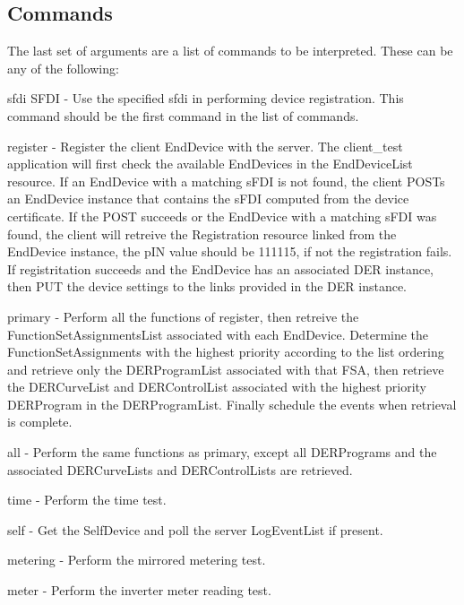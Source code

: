 \subsection*{Commands }

The last set of arguments are a list of commands to be interpreted. These can be any of the following\+:


\begin{DoxyItemize}
\item {\ttfamily sfdi S\+F\+DI} -\/ Use the specified sfdi in performing device registration. This command should be the first command in the list of commands.
\item {\ttfamily register} -\/ Register the client End\+Device with the server. The {\ttfamily client\+\_\+test} application will first check the available End\+Devices in the End\+Device\+List resource. If an End\+Device with a matching s\+F\+DI is not found, the client P\+O\+S\+Ts an End\+Device instance that contains the s\+F\+DI computed from the device certificate. If the P\+O\+ST succeeds or the End\+Device with a matching s\+F\+DI was found, the client will retreive the Registration resource linked from the End\+Device instance, the p\+IN value should be 111115, if not the registration fails. If registritation succeeds and the End\+Device has an associated D\+ER instance, then P\+UT the device settings to the links provided in the D\+ER instance.
\item {\ttfamily primary} -\/ Perform all the functions of {\ttfamily register}, then retreive the Function\+Set\+Assignments\+List associated with each End\+Device. Determine the Function\+Set\+Assignments with the highest priority according to the list ordering and retrieve only the D\+E\+R\+Program\+List associated with that F\+SA, then retrieve the D\+E\+R\+Curve\+List and D\+E\+R\+Control\+List associated with the highest priority D\+E\+R\+Program in the D\+E\+R\+Program\+List. Finally schedule the events when retrieval is complete.
\item {\ttfamily all} -\/ Perform the same functions as {\ttfamily primary}, except all D\+E\+R\+Programs and the associated D\+E\+R\+Curve\+Lists and D\+E\+R\+Control\+Lists are retrieved.
\item {\ttfamily time} -\/ Perform the time test.
\item {\ttfamily self} -\/ Get the Self\+Device and poll the server Log\+Event\+List if present.
\item {\ttfamily metering} -\/ Perform the mirrored metering test.
\item {\ttfamily meter} -\/ Perform the inverter meter reading test.

\end{DoxyItemize}
